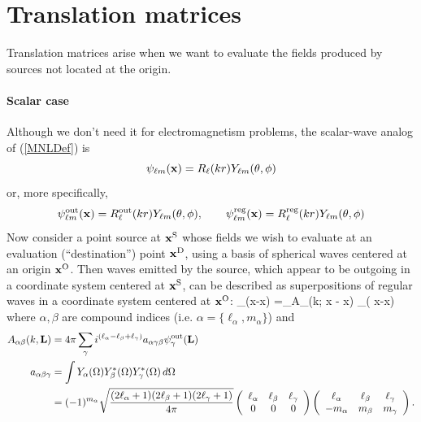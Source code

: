 \documentclass[letterpaper]{article}
\newcommand{\lm}{_{\ell m}}
\begin{document}
\newpage
\section{Translation matrices}
\label{TranslationMatrixSection}

Translation matrices arise when we want to evaluate the fields
produced by sources not located at the origin. 

\paragraph{Scalar case}
Although we don't need it for electromagnetism problems,
the scalar-wave analog of (\ref{MNLDef}) is
$$ \psi\lm(\vb x) = R_\ell(kr)Y\lm(\theta,\phi)$$
or, more specifically,
$$ \psi\lm\sups{out}(\vb x) = R_\ell\sups{out}(kr)Y\lm(\theta,\phi),
   \qquad
   \psi\lm\sups{reg}(\vb x) = R_\ell\sups{reg}(kr)Y\lm(\theta,\phi)
$$
Now consider a point source at $\mathbf{x}^{\text{\scriptsize S}}$ whose fields we wish
to evaluate at an evaluation (``destination'') point $\mathbf{x}^{\text{\scriptsize D}}$,
using a basis of spherical waves centered at an origin $\mathbf{x}^{\text{\scriptsize O}}$.
Then waves emitted by the source, which appear to be outgoing in a
coordinate system centered at $\mathbf{x}^{\text{\scriptsize S}}$, can be described
as superpositions of regular waves in a coordinate system
centered at $\mathbf{x}^{\text{\scriptsize O}}$:
{ \psi{}_\alpha\big(\vb x-\vb x\big)
   =\sum_\beta A_{\alpha\beta}\big(k; \vb x - \vb x\big)
               \psi{}_\beta\big( \vb x-\vb x\big)
}
where $\alpha,\beta$ are compound indices 
(i.e. $\alpha=\{\ell_\alpha, m_\alpha\}$) and 
\begin{align*}
 A_{\alpha\beta}(k, \mathbf{L})
&=4\pi 
  \sum_\gamma i^{(\ell_\alpha - \ell_\beta + \ell_\gamma)}
  a_{\alpha\gamma\beta} 
  \psi^{\text{\scriptsize out}}_\gamma(\mathbf{L})
\\
a_{\alpha\beta\gamma}
&=\int Y_\alpha(\Omega) Y^*_\beta(\Omega) Y^*_\gamma(\Omega) \, d\Omega
\\
&=(-1)^{m_\alpha}
  \sqrt\frac{ (2\ell_\alpha+1)(2\ell_\beta+1) (2\ell_\gamma+1)}
            {4\pi}
  \left(\begin{array}{ccc} 
        \ell_\alpha & \ell_\beta & \ell_\gamma \\ 0 & 0 & 0 
        \end{array}\right)
  \left(\begin{array}{ccc} 
        \ell_\alpha & \ell_\beta & \ell_\gamma \\ 
          -m_\alpha & m_\beta    & m_\gamma
        \end{array}\right).
\end{align*}
\end{document}
